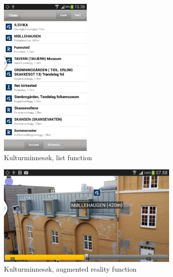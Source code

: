 \documentclass[11pt]{book}
\begin{document}
\begin{figure}[H]
      \centering
      \includegraphics[width=0.4\textwidth]{Figures/Prestudy/kulturSokList.png}
      \caption{Kulturminnesøk, list function}
      \label{fig:pre_kulturMinneAppList}
\end{figure}

\begin{figure}[H]
      \centering
      \includegraphics[width=0.8\textwidth]{Figures/Prestudy/kulturSokAR1.png}
      \caption{Kulturminnesøk, augmented reality function}
      \label{fig:pre_kulturMinneAppAug}
\end{figure}
\end{document}

